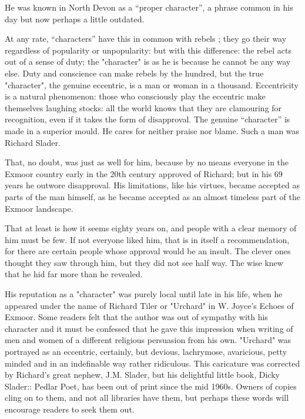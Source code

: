 
He was known in North Devon as a “proper character”, a phrase common in his day but now perhaps a little outdated.

At any rate, “characters” have this in common with rebels ; they go their way regardless of popularity or unpopularity: but with this difference: the rebel acts out of a sense of duty; the "character" is as he is because he cannot be any way else. Duty and conscience can make rebels by the hundred, but the true "character", the genuine eccentric, is a man or woman in a thousand. Eccentricity is a natural phenomenon: those who consciously play the eccentric make themselves laughing stocks: all the world knows that they are clamouring for recognition, even if it takes the form of disapproval. The genuine “character” is made in a superior mould. He cares for neither praise nor blame. Such a man was Richard Slader.

That, no doubt, was just as well for him, because by no means everyone in the Exmoor country early in the 20th century approved of Richard; but in his 69 years he outwore disapproval. His limitations, like his virtues, became accepted as parts of the man himself, as he became accepted as an almost timeless part of the Exmoor landscape.

That at least is how it seems eighty years on, and people with a clear memory of him must be few. If not everyone liked him, that is in itself a recommendation, for there are certain people whose approval would be an insult. The clever ones thought they saw through him, but they did not see half way. The wise knew that he hid far more than he revealed.

His reputation as a "character" was purely local until late in his life, when he appeared under the name of Richard Tiler   or "Urchard" in W. Joyce's Echoes of Exmoor. Some readers felt that the author was out of sympathy with his character and it must be confessed that he gave this impression when writing of men and women of a different religious persuasion from his own. "Urchard" was portrayed as an eccentric, certainly, but devious, lachrymose, avaricious, petty minded and in an indefinable way rather ridiculous. This caricature was corrected by Richard's great nephew, J.M. Slader, but his delightful little book, Dicky Slader:: Pedlar Poet, has been out of print since the mid 1960s. Owners of copies cling on to them, and not all libraries have them, but perhaps these words will encourage readers to seek them out.

